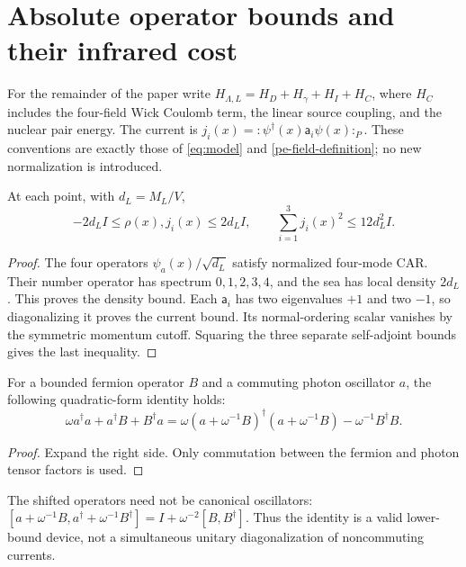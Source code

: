\section{Absolute operator bounds and their infrared cost}
\label{sec:lower-proof}

For the remainder of the paper write
$H_{\Lambda,L}=H_D+H_\gamma+H_I+H_C$, where $H_C$ includes
the four-field Wick Coulomb term, the linear source coupling, and
the nuclear pair energy. The current is
$j_i(x)=:\!\psi^\dagger(x)\mathsf a_i\psi(x)\!:_P$.
These conventions are exactly those of \eqref{eq:model} and
\eqref{pe-field-definition}; no new normalization is introduced.

\begin{lemma}
\label{lem:local}
At each point, with $d_L=M_L/V$,
\begin{equation}
 -2d_LI\le\rho(x),j_i(x)\le2d_LI,
 \qquad \sum_{i=1}^3j_i(x)^2\le12d_L^2I.
 \label{eq:local-bounds}
\end{equation}
\end{lemma}
\begin{proof}
The four operators $\psi_a(x)/\sqrt{d_L}$ satisfy normalized
four-mode CAR. Their number operator has spectrum $0,1,2,3,4$,
and the sea has local density $2d_L$. This proves the density bound.
Each $\mathsf a_i$ has two eigenvalues $+1$ and two $-1$, so
diagonalizing it proves the current bound. Its normal-ordering scalar
vanishes by the symmetric momentum cutoff. Squaring the three
separate self-adjoint bounds gives the last inequality.
\end{proof}

\begin{lemma}
\label{lem:square}
For a bounded fermion operator $B$ and a commuting photon oscillator
$a$, the following quadratic-form identity holds:
\begin{equation}
 \omega a^\dagger a+a^\dagger B+B^\dagger a
 =\omega(a+\omega^{-1}B)^\dagger(a+\omega^{-1}B)
   -\omega^{-1}B^\dagger B.
 \label{eq:square}
\end{equation}
\end{lemma}
\begin{proof}
Expand the right side. Only commutation between the fermion and
photon tensor factors is used.
\end{proof}
The shifted operators need not be canonical oscillators:
$[a+\omega^{-1}B,a^\dagger+\omega^{-1}B^\dagger]
=I+\omega^{-2}[B,B^\dagger]$. Thus the identity is a valid
lower-bound device, not a simultaneous unitary diagonalization of
noncommuting currents.

